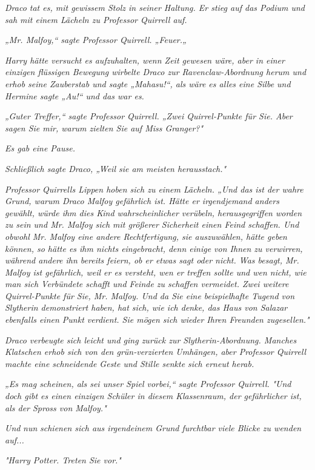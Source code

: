 {\emph{Draco tat es, mit gewissem Stolz in seiner Haltung. Er stieg auf das Podium und sah mit einem Lächeln zu Professor Quirrell auf.}

\emph{„Mr. Malfoy,“ sagte Professor Quirrell. „Feuer.„}

\emph{Harry hätte versucht es aufzuhalten, wenn Zeit gewesen wäre, aber in einer einzigen flüssigen Bewegung wirbelte Draco zur Ravenclaw-Abordnung herum und erhob seine Zauberstab und sagte „\emph{Mahasu!}“, als wäre es alles eine Silbe und Hermine sagte „Au!“ und das war es.}

\emph{„Guter Treffer,“ sagte Professor Quirrell. „Zwei Quirrel-Punkte für Sie. Aber sagen Sie mir, warum zielten Sie auf Miss Granger?"}

\emph{Es gab eine Pause.}

\emph{Schließlich sagte Draco, „Weil sie am meisten herausstach."}

\emph{Professor Quirrells Lippen hoben sich zu einem Lächeln. „Und das ist der wahre Grund, warum Draco Malfoy gefährlich ist. Hätte er irgendjemand anders gewählt, würde ihm dies Kind wahrscheinlicher verübeln, herausgegriffen worden zu sein und Mr. Malfoy sich mit größerer Sicherheit einen Feind schaffen. Und obwohl Mr. Malfoy eine andere Rechtfertigung, sie auszuwählen, hätte geben können, so hätte es ihm nichts eingebracht, denn einige von Ihnen zu verwirren, während andere ihn bereits feiern, ob er etwas sagt oder nicht. Was besagt, Mr. Malfoy ist gefährlich, weil er es versteht, wen er treffen sollte und wen nicht, wie man sich Verbündete schafft und Feinde zu schaffen vermeidet. Zwei weitere Quirrel-Punkte für Sie, Mr. Malfoy. Und da Sie eine beispielhafte Tugend von Slytherin demonstriert haben, hat sich, wie ich denke, das Haus von Salazar ebenfalls einen Punkt verdient. Sie mögen sich wieder Ihren Freunden zugesellen."}

\emph{Draco verbeugte sich leicht und ging zurück zur Slytherin-Abordnung. Manches Klatschen erhob sich von den grün-verzierten Umhängen, aber Professor Quirrell machte eine schneidende Geste und Stille senkte sich erneut herab.}

\emph{„Es mag scheinen, als sei unser Spiel vorbei,“ sagte Professor Quirrell.} \emph{"Und doch gibt es einen einzigen Schüler in diesem Klassenraum, der gefährlicher ist, als der Spross von Malfoy."}

\emph{Und} \emph{\emph{nun}} \emph{schienen sich aus irgendeinem Grund furchtbar viele Blicke zu wenden auf...}

\emph{"Harry Potter. Treten Sie vor."}

}
